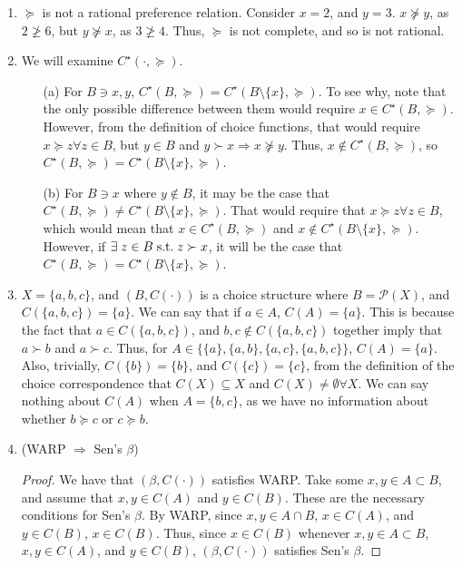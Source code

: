 \documentclass[12pt]{article}
\begin{document}
\begin{enumerate}
\item $\succeq$ is not a rational preference relation. Consider $x = 2$, and $y = 3$. $x \not\succeq y$, as $2 \not\ge 6$, but $y \not\succeq x$, as $3 \not\ge 4$. Thus, $\succeq$ is not complete, and so is not rational.

\item We will examine $C^\star(\cdot, \succeq)$.
\begin{itemize}
	\item[(a)] For $B \ni x,y$, $C^\star(B,\succeq) = C^\star(B \setminus \{x\},\succeq)$. To see why, note that the only possible difference between them would require $x \in C^\star(B,\succeq)$. However, from the definition of choice functions, that would require $x \succeq z \forall z \in B$, but $y \in B$ and $y \succ x \Rightarrow x \not\succeq y$. Thus, $x \not\in C^\star(B,\succeq)$, so $C^\star(B,\succeq) = C^\star(B \setminus \{x\},\succeq)$.
	
	\item[(b)] For $B \ni x$ where $y \not\in B$, it may be the case that $C^\star(B,\succeq) \ne C^\star(B \setminus \{x\},\succeq)$. That would require that $x \succeq z \forall z \in B$, which would mean that $x \in C^\star(B,\succeq)$ and $x \not\in C^\star(B\setminus \{x\},\succeq)$. However, if $\exists z \in B \st z \succ x$, it will be the case that $C^\star(B,\succeq) = C^\star(B \setminus \{x\},\succeq)$.
\end{itemize}

\item $X = \{a,b,c\}$, and $(B,C(\cdot))$ is a choice structure where $B = \mathcal{P}(X)$, and $C(\{a,b,c\}) = \{a\}$. We can say that if $a \in A$, $C(A) = \{a\}$. This is because the fact that $a \in C(\{a,b,c\})$, and $b,c \not\in C(\{a,b,c\})$ together imply that $a \succ b$ and $a \succ c$. Thus, for $A \in \{ \{a\},\{a,b\},\{a,c\},\{a,b,c\}\}$, $C(A) = \{a\}$. Also, trivially, $C(\{b\}) = \{b\}$, and $C(\{c\}) = \{c\}$, from the definition of the choice correspondence that $C(X) \subseteq X$ and $C(X) \ne \emptyset \forall X$. We can say nothing about $C(A)$ when $A = \{b,c\}$, as we have no information about whether $b \succeq c$ or $c \succeq b$.

\item (WARP $\Rightarrow$ Sen's $\beta$)

\begin{proof}
	We have that $(\beta, C(\cdot))$ satisfies WARP. Take some $x,y \in A \subset B$, and assume that $x,y \in C(A)$ and $y \in C(B)$. These are the necessary conditions for Sen's $\beta$. By WARP, since $x,y \in A \cap B$, $x \in C(A)$, and $y \in C(B)$, $x \in C(B)$. Thus, since $x \in C(B)$ whenever $x,y \in A \subset B$, $x,y \in C(A)$, and $y \in C(B)$, $(\beta,C(\cdot))$ satisfies Sen's $\beta$.
\end{proof} 


\end{enumerate}
\end{document}
